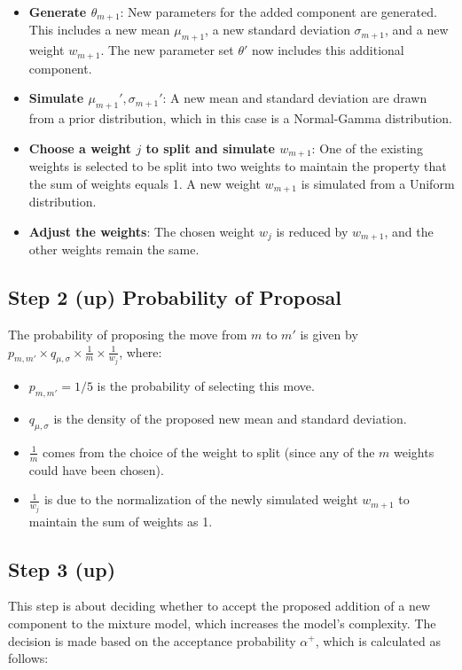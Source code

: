 \documentclass[10pt]{article}
\begin{document}
\begin{itemize}
  \item \textbf{Generate \( \theta_{m+1} \)}: New parameters for the added component are generated. This includes a new mean \( \mu_{m+1} \), a new standard deviation \( \sigma_{m+1} \), and a new weight \( w_{m+1} \). The new parameter set \( \theta' \) now includes this additional component.

  \item \textbf{Simulate \( \mu_{m+1}', \sigma_{m+1}' \)}: A new mean and standard deviation are drawn from a prior distribution, which in this case is a Normal-Gamma distribution.

  \item \textbf{Choose a weight \( j \) to split and simulate \( w_{m+1} \)}: One of the existing weights is selected to be split into two weights to maintain the property that the sum of weights equals 1. A new weight \( w_{m+1} \) is simulated from a Uniform distribution.

  \item \textbf{Adjust the weights}: The chosen weight \( w_j \) is reduced by \( w_{m+1} \), and the other weights remain the same.

\end{itemize}

\subsection*{Step 2 (up) Probability of Proposal}
The probability of proposing the move from \( m \) to \( m' \) is given by \( p_{m,m'} \times q_{\mu,\sigma} \times \frac{1}{m} \times \frac{1}{w_j} \), where:

\begin{itemize}
  \item \( p_{m,m'} = 1/5 \) is the probability of selecting this move.
  \item \( q_{\mu,\sigma} \) is the density of the proposed new mean and standard deviation.
  \item \( \frac{1}{m} \) comes from the choice of the weight to split (since any of the \( m \) weights could have been chosen).
  \item \( \frac{1}{w_j} \) is due to the normalization of the newly simulated weight \( w_{m+1} \) to maintain the sum of weights as 1.
\end{itemize}

\subsection*{Step 3 (up)}
This step is about deciding whether to accept the proposed addition of a new component to the mixture model, which increases the model's complexity. The decision is made based on the acceptance probability \( \alpha^+ \), which is calculated as follows:
\end{document}
